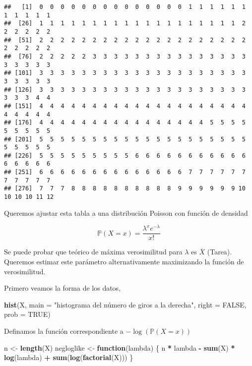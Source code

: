 \documentclass[
  12pt,
]{book}
\newenvironment{Shaded}{\begin{snugshade}}{\end{snugshade}}
\newcommand{\ControlFlowTok}[1]{\textcolor[rgb]{0.13,0.29,0.53}{\textbf{#1}}}
\newcommand{\DataTypeTok}[1]{\textcolor[rgb]{0.13,0.29,0.53}{#1}}
\newcommand{\KeywordTok}[1]{\textcolor[rgb]{0.13,0.29,0.53}{\textbf{#1}}}
\newcommand{\NormalTok}[1]{#1}
\newcommand{\OperatorTok}[1]{\textcolor[rgb]{0.81,0.36,0.00}{\textbf{#1}}}
\newcommand{\OtherTok}[1]{\textcolor[rgb]{0.56,0.35,0.01}{#1}}
\newcommand{\StringTok}[1]{\textcolor[rgb]{0.31,0.60,0.02}{#1}}
\begin{document}
\begin{verbatim}
##   [1]  0  0  0  0  0  0  0  0  0  0  0  0  0  0  1  1  1  1  1  1  1  1  1  1  1
##  [26]  1  1  1  1  1  1  1  1  1  1  1  1  1  1  1  1  1  1  1  2  2  2  2  2  2
##  [51]  2  2  2  2  2  2  2  2  2  2  2  2  2  2  2  2  2  2  2  2  2  2  2  2  2
##  [76]  2  2  2  2  2  3  3  3  3  3  3  3  3  3  3  3  3  3  3  3  3  3  3  3  3
## [101]  3  3  3  3  3  3  3  3  3  3  3  3  3  3  3  3  3  3  3  3  3  3  3  3  3
## [126]  3  3  3  3  3  3  3  3  3  3  3  3  3  3  3  3  3  3  3  3  3  3  3  4  4
## [151]  4  4  4  4  4  4  4  4  4  4  4  4  4  4  4  4  4  4  4  4  4  4  4  4  4
## [176]  4  4  4  4  4  4  4  4  4  4  4  4  4  4  4  4  5  5  5  5  5  5  5  5  5
## [201]  5  5  5  5  5  5  5  5  5  5  5  5  5  5  5  5  5  5  5  5  5  5  5  5  5
## [226]  5  5  5  5  5  5  5  5  5  6  6  6  6  6  6  6  6  6  6  6  6  6  6  6  6
## [251]  6  6  6  6  6  6  6  6  6  6  6  6  6  6  7  7  7  7  7  7  7  7  7  7  7
## [276]  7  7  7  8  8  8  8  8  8  8  8  8  8  9  9  9  9  9  9 10 10 10 10 11 12
\end{verbatim}

Queremos ajustar esta tabla a una distribución Poisson con función de densidad

\[
\mathbb{P}(X=x) = \frac{\lambda^x e^{-\lambda}}{x!} 
\]

Se puede probar que teórico de máxima verosimilitud para \(\lambda\) es \(\overline{X}\) (Tarea). Queremos estimar este parámetro alternativamente maximizando la función de verosimilitud.

Primero veamos la forma de los datos,

\begin{Shaded}
\begin{Highlighting}[]
\KeywordTok{hist}\NormalTok{(X, }\DataTypeTok{main =} \StringTok{"histograma del número de giros a la derecha"}\NormalTok{, }
    \DataTypeTok{right =} \OtherTok{FALSE}\NormalTok{, }\DataTypeTok{prob =} \OtherTok{TRUE}\NormalTok{)}
\end{Highlighting}
\end{Shaded}

Definamos la función correspondiente a \(-\log(\mathbb{P}(X=x))\)

\begin{Shaded}
\begin{Highlighting}[]
\NormalTok{n \textless{}{-}}\StringTok{ }\KeywordTok{length}\NormalTok{(X)}
\NormalTok{negloglike \textless{}{-}}\StringTok{ }\ControlFlowTok{function}\NormalTok{(lambda) \{}
\NormalTok{    n }\OperatorTok{*}\StringTok{ }\NormalTok{lambda }\OperatorTok{{-}}\StringTok{ }\KeywordTok{sum}\NormalTok{(X) }\OperatorTok{*}\StringTok{ }\KeywordTok{log}\NormalTok{(lambda) }\OperatorTok{+}\StringTok{ }\KeywordTok{sum}\NormalTok{(}\KeywordTok{log}\NormalTok{(}\KeywordTok{factorial}\NormalTok{(X)))}
\NormalTok{\}}
\end{Highlighting}
\end{Shaded}
\end{document}
